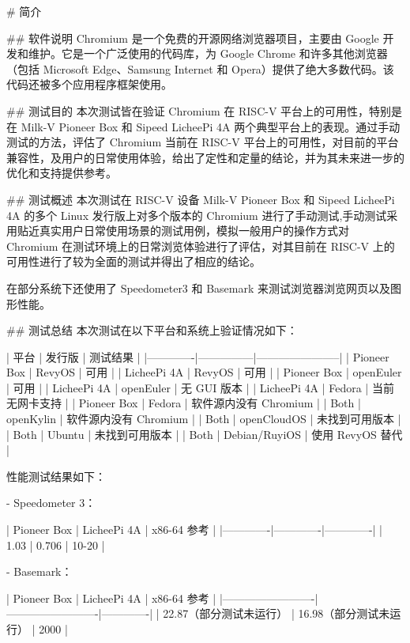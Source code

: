\documentclass{article}
\begin{document}
\begin{markdown}

# 简介

## 软件说明
Chromium 是一个免费的开源网络浏览器项目，主要由 Google 开发和维护。它是一个广泛使用的代码库，为 Google Chrome 和许多其他浏览器（包括 Microsoft Edge、Samsung Internet 和 Opera）提供了绝大多数代码。该代码还被多个应用程序框架使用。

## 测试目的
本次测试皆在验证 Chromium 在 RISC-V 平台上的可用性，特别是在 Milk-V Pioneer Box 和 Sipeed LicheePi 4A 两个典型平台上的表现。通过手动测试的方法，评估了 Chromium 当前在 RISC-V 平台上的可用性，对目前的平台兼容性，及用户的日常使用体验，给出了定性和定量的结论，并为其未来进一步的优化和支持提供参考。

## 测试概述
本次测试在 RISC-V 设备 Milk-V Pioneer Box 和 Sipeed LicheePi 4A 的多个 Linux 发行版上对多个版本的 Chromium 进行了手动测试,手动测试采用贴近真实用户日常使用场景的测试用例，模拟一般用户的操作方式对 Chromium 在测试环境上的日常浏览体验进行了评估，对其目前在 RISC-V 上的可用性进行了较为全面的测试并得出了相应的结论。

在部分系统下还使用了 Speedometer3 和 Basemark 来测试浏览器浏览网页以及图形性能。

## 测试总结
本次测试在以下平台和系统上验证情况如下：

| 平台        | 发行版        | 测试结果              |
|-------------|---------------|-----------------------|
| Pioneer Box | RevyOS        | 可用                  |
| LicheePi 4A | RevyOS        | 可用                  |
| Pioneer Box | openEuler     | 可用                  |
| LicheePi 4A | openEuler     | 无 GUI 版本           |
| LicheePi 4A | Fedora        | 当前无网卡支持        |
| Pioneer Box | Fedora        | 软件源内没有 Chromium |
| Both        | openKylin     | 软件源内没有 Chromium |
| Both        | openCloudOS   | 未找到可用版本        |
| Both        | Ubuntu        | 未找到可用版本        |
| Both        | Debian/RuyiOS | 使用 RevyOS 替代      |


性能测试结果如下：

- Speedometer 3：

| Pioneer Box | LicheePi 4A | x86-64 参考 |
|-------------|-------------|-------------|
|    1.03     | 0.706       | 10-20       |

- Basemark：

| Pioneer Box             | LicheePi 4A             | x86-64 参考 |
|-------------------------|-------------------------|-------------|
| 22.87（部分测试未运行） | 16.98（部分测试未运行） | 2000        |


\end{markdown}
\end{document}
